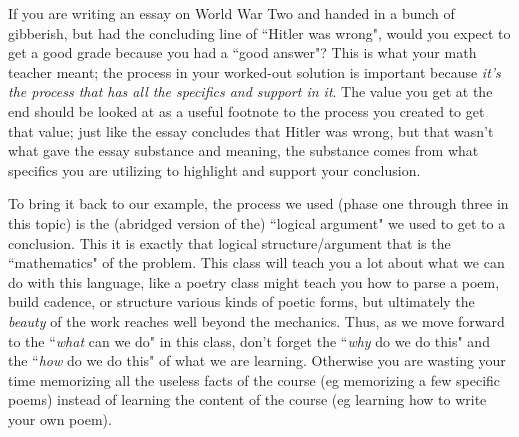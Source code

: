 \documentclass{ximeraXloud}
\begin{document}
If you are writing an essay on World War Two and handed in a bunch of gibberish, but had the concluding line of ``Hitler was wrong", would you expect to get a good grade because you had a ``good answer"? This is what your math teacher meant; the process in your worked-out solution is important because \textit{it's the process that has all the specifics and support in it}. The value you get at the end should be looked at as a useful footnote to the process you created to get that value; just like the essay concludes that Hitler was wrong, but that wasn't what gave the essay substance and meaning, the substance comes from what specifics you are utilizing to highlight and support your conclusion.

To bring it back to our example, the process we used (phase one through three in this topic) is the (abridged version of the) ``logical argument" we used to get to a conclusion. This it is exactly that logical structure/argument that is the ``mathematics" of the problem. This class will teach you a lot about what we can do with this language, like a poetry class might teach you how to parse a poem, build cadence, or structure various kinds of poetic forms, but ultimately the \textit{beauty} of the work reaches well beyond the mechanics. Thus, as we move forward to the ``\textit{what} can we do" in this class, don't forget the ``\textit{why} do we do this" and the ``\textit{how} do we do this" of what we are learning. Otherwise you are wasting your time memorizing all the useless facts of the course (eg memorizing a few specific poems) instead of learning the content of the course (eg learning how to write your own poem).
\end{document}
